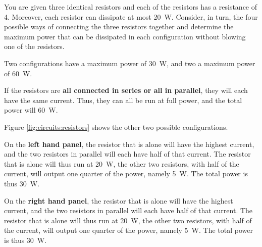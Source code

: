 \question You are given three identical resistors and each of the resistors has a resistance of \SI{4}{\Omega}. Moreover, each resistor can dissipate at most \SI{20}{W}. Consider, in turn, the four possible ways of connecting the three resistors together and determine the maximum power that can be dissipated in each configuration without blowing one of the resistors.
\begin{finalanswer}
Two configurations have a maximum power of \SI{30}{W}, and two a maximum power of \SI{60}{W}. 
\end{finalanswer}
\begin{solution}
If the resistors are \textbf{all connected in series or all in parallel}, they will each have the same current. Thus, they can all be run at full power, and the total power will \SI{60}{W}.

Figure \ref{fig:circuits:resistors} shows the other two possible configurations.

On the \textbf{left hand panel}, the resistor that is alone will have the highest current, and the two resistors in parallel will each have half of that current. The resistor that is alone will thus run at \SI{20}{W}, the other two resistors, with half of the current, will output one quarter of the power, namely \SI{5}{W}. The total power is thus \SI{30}{W}.

On the \textbf{right hand panel}, the resistor that is alone will have the highest current, and the two resistors in parallel will each have half of that current. The resistor that is alone will thus run at \SI{20}{W}, the other two resistors, with half of the current, will output one quarter of the power, namely \SI{5}{W}. The total power is thus \SI{30}{W}.

\end{solution}


